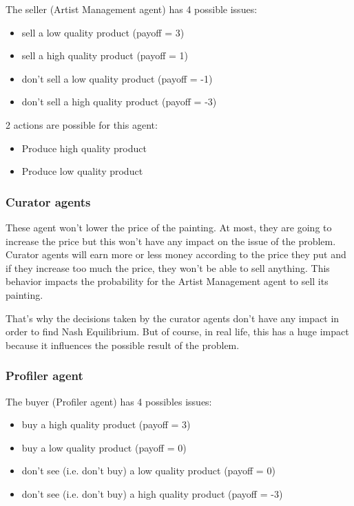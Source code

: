 \documentclass[a4paper,11pt]{article}
\begin{document}
  The seller (Artist Management agent) has 4 possible issues:
  \begin{itemize}
   \item sell a low quality product (payoff = 3)
   \item sell a high quality product (payoff = 1)
   \item don't sell a low quality product (payoff = -1)
   \item don't sell a high quality product (payoff = -3)
  \end{itemize}
  
  2 actions are possible for this agent:
  \begin{itemize}
   \item Produce high quality product
   \item Produce low quality product
  \end{itemize}
  
  \subsubsection{Curator agents}

  These agent won't lower the price of the painting. At most, they are going 
  to increase the price but this won't have any impact on the issue of the problem.
  Curator agents will earn more or less money according to the price they put and if 
  they increase too much the price, they won't be able to sell anything. This behavior 
  impacts the probability for the Artist Management agent to sell its painting.
  
  That's why the decisions taken by the curator agents don't have any impact in order to 
  find Nash Equilibrium. But of course, in real life, this has a huge impact because it 
  influences the possible result of the problem.
  
  \subsubsection{Profiler agent}
  
  The buyer (Profiler agent) has 4 possibles issues:
  \begin{itemize}
   \item buy a high quality product (payoff = 3)
   \item buy a low quality product (payoff = 0)
   \item don't see (i.e. don't buy) a low quality product (payoff = 0)
   \item don't see (i.e. don't buy) a high quality product (payoff = -3)
  \end{itemize}
  
\end{document}
